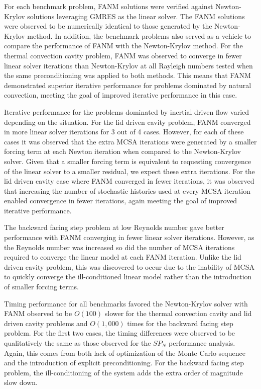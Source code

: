 For each benchmark problem, FANM solutions were verified against
Newton-Krylov solutions leveraging GMRES as the linear solver. The
FANM solutions were observed to be numerically identical to those
generated by the Newton-Krylov method. In addition, the benchmark
problems also served as a vehicle to compare the performance of FANM
with the Newton-Krylov method. For the thermal convection cavity
problem, FANM was observed to converge in fewer linear solver
iterations than Newton-Krylov at all Rayleigh numbers tested when the
same preconditioning was applied to both methods. This means that FANM
demonstrated superior iterative performance for problems dominated by
natural convection, meeting the goal of improved iterative performance
in this case.

Iterative performance for the problems dominated by inertial driven
flow varied depending on the situation. For the lid driven cavity
problem, FANM converged in more linear solver iterations for 3 out of
4 cases. However, for each of these cases it was observed that the
extra MCSA iterations were generated by a smaller forcing term at each
Newton iteration when compared to the Newton-Krylov solver. Given that
a smaller forcing term is equivalent to requesting convergence of the
linear solver to a smaller residual, we expect these extra
iterations. For the lid driven cavity case where FANM converged in
fewer iterations, it was observed that increasing the number of
stochastic histories used at every MCSA iteration enabled convergence
in fewer iterations, again meeting the goal of improved iterative
performance.

The backward facing step problem at low Reynolds number gave better
performance with FANM converging in fewer linear solver
iterations. However, as the Reynolds number was increased so did the
number of MCSA iterations required to converge the linear model at
each FANM iteration. Unlike the lid driven cavity problem, this was
discovered to occur due to the inability of MCSA to quickly converge
the ill-conditioned linear model rather than the introduction of
smaller forcing terms.

Timing performance for all benchmarks favored the Newton-Krylov solver
with FANM observed to be $O(100)$ slower for the thermal convection
cavity and lid driven cavity problems and $O(1,000)$ times for the
backward facing step problem. For the first two cases, the timing
differences were observed to be qualitatively the same as those
observed for the $SP_N$ performance analysis. Again, this comes from
both lack of optimization of the Monte Carlo sequence and the
introduction of explicit preconditioning. For the backward facing step
problem, the ill-conditioning of the system adds the extra order of
magnitude slow down.

